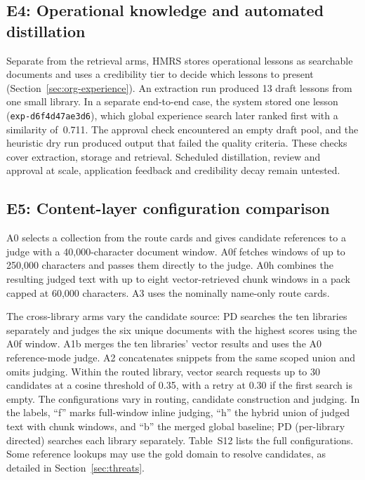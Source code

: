 \subsection{E4: Operational knowledge and automated distillation}
\label{sec:e3}
Separate from the retrieval arms, HMRS stores operational lessons as
searchable documents and uses a credibility tier to decide which lessons to present
(Section~\ref{sec:org-experience}). An extraction run produced 13 draft
lessons from one small library. In a separate end-to-end case, the system
stored one lesson (\texttt{exp-d6f4d47ae3d6}), which global experience
search later ranked first with a similarity of~0.711. The approval check
encountered an empty draft pool, and the heuristic dry run produced output
that failed the quality criteria. These checks cover extraction, storage
and retrieval. Scheduled distillation, review and approval at scale,
application feedback and credibility decay remain untested.

\subsection{E5: Content-layer configuration comparison}
\label{sec:ladder-opt}
A0 selects a collection from the route cards and gives candidate references
to a judge with a 40{,}000-character document window. A0f fetches windows of
up to 250{,}000 characters and passes them directly to the judge. A0h
combines the resulting judged text with up to eight vector-retrieved chunk
windows in a pack capped at 60{,}000 characters. A3 uses the nominally
name-only route cards.

The cross-library arms vary the candidate source: PD searches the ten
libraries separately and judges the six unique documents with the highest
scores using the A0f window. A1b merges the ten libraries' vector results
and uses the A0 reference-mode judge. A2 concatenates snippets from the
same scoped union and omits judging. Within the routed library, vector
search requests up to 30 candidates at a cosine threshold of 0.35, with
a retry at 0.30 if the first search is empty.
The configurations vary in routing, candidate construction and judging.
In the labels, ``f'' marks full-window inline judging, ``h'' the hybrid
union of judged text with chunk windows, and ``b'' the merged global
baseline; PD (per-library directed) searches each library separately.
Table~S12 lists the full configurations.
Some reference lookups may use the gold domain to resolve candidates,
as detailed in Section~\ref{sec:threats}.

